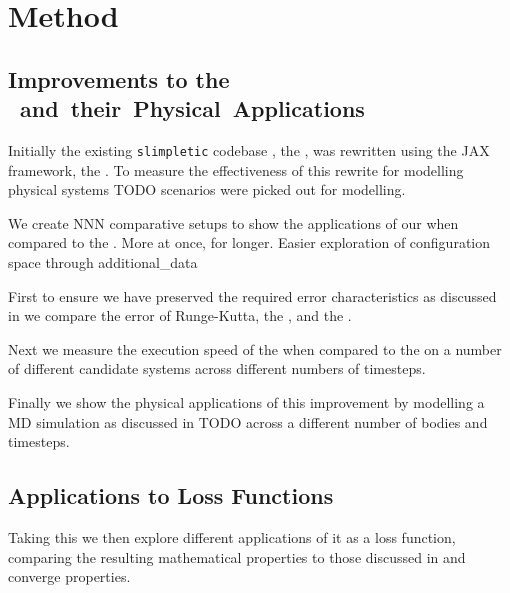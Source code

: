\section{Method}

\subsection{Improvements to the \SI{} and their Physical Applications}


Initially the existing \texttt{slimpletic} codebase \cite{originalCode}, the \orgimpl{}, was rewritten using the JAX framework, the \updimpl{}. To measure the effectiveness of this rewrite for modelling physical systems TODO scenarios were picked out for modelling.

We create NNN comparative setups to show the applications of our \updimpl{} when compared to the \orgimpl{}. More at once, for longer. Easier exploration of configuration space through additional\_data

First to ensure we have preserved the required error characteristics as discussed in  we compare the error of Runge-Kutta, the \orgimpl{}, and the \updimpl{}.

Next we measure the execution speed of the \updimpl{} when compared to the \orgimpl{} on a number of different candidate systems across different numbers of timesteps.

Finally we show the physical applications of this improvement by modelling a MD simulation as discussed in TODO across a different number of bodies and timesteps.


\subsection{Applications to Loss Functions}

Taking this \updimpl{} we then explore different applications of it as a loss function, comparing the resulting mathematical properties to those discussed in  and converge properties.

